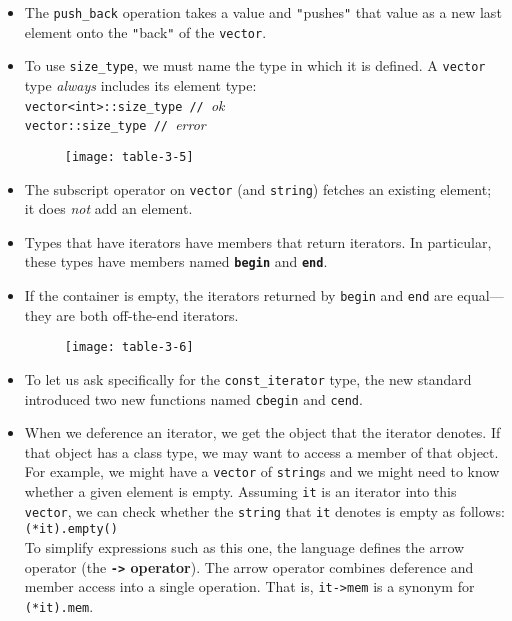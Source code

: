 \begin{itemize}
\item
The \texttt{push\_back} operation takes a value and \texttt{"}pushes\texttt{"} that value as a new last element onto the \texttt{"}back\texttt{"} of the \texttt{vector}.

\item
To use \texttt{size\_type}, we must name the type in which it is defined. A \texttt{vector} type \textit{always} includes its element type:\\
\hspace*{1em}\texttt{vector<int>::size\_type // }\textit{ok}\\
\hspace*{1em}\texttt{vector::size\_type // }\textit{error}

\begin{figure}[ht]
\texttt{[image: table-3-5]}
\centering
\end{figure}

\item
The subscript operator on \texttt{vector} (and \texttt{string}) fetches an existing element; it does \textit{not} add an element.

\item
Types that have iterators have members that return iterators. In particular, these types have members named \textbf{\texttt{begin}} and \textbf{\texttt{end}}.

\item
If the container is empty, the iterators returned by \texttt{begin} and \texttt{end} are equal---they are both off-the-end iterators.

\begin{figure}[ht]
\texttt{[image: table-3-6]}
\centering
\end{figure}

\item
To let us ask specifically for the \texttt{const\_iterator} type, the new standard introduced two new functions named \texttt{cbegin} and \texttt{cend}.

\item
When we deference an iterator, we get the object that the iterator denotes. If that object has a class type, we may want to access a member of that object. For example, we might have a \texttt{vector} of \texttt{string}s and we might need to know whether a given element is empty. Assuming \texttt{it} is an iterator into this \texttt{vector}, we can check whether the \texttt{string} that \texttt{it} denotes is empty as follows:\\
\hspace*{1em}\texttt{(*it).empty()}\\
To simplify expressions such as this one, the language defines the arrow operator (the \textbf{\texttt{->} operator}). The arrow operator combines deference and member access into a single operation. That is, \texttt{it->mem} is a synonym for \texttt{(*it).mem}.


\end{itemize}
